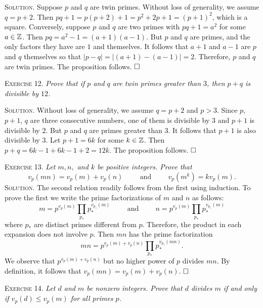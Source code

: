 \documentclass[11pt, leqno]{article}
\newcommand{\done}{\ensuremath{\hfill\square}}
\begin{document}
\textsc{Solution}. Suppose $p$ and $q$ are twin primes. Without loss of generality, we assume $q = p+2$. Then $pq+1 = p(p+2) + 1 = p^2 + 2p + 1 = (p+1)^2$, which is a square. Conversely, suppose $p$ and $q$ are two primes with $pq+1 = a^2$ for some $a\in\mathbb{Z}$. Then $pq = a^2-1 = (a+1)(a-1)$. But $p$ and $q$ are primes, and the only factors they have are $1$ and themselves. It follows that $a+1$ and $a-1$ are $p$ and $q$ themselves so that $|p-q| = |(a+1)-(a-1)| =  2$. Therefore, $p$ and $q$ are twin primes. The proposition follows. \done

\textsc{Exercise 12}. \emph{Prove that if $p$ and $q$ are twin primes greater than $3$, then $p+q$ is divisible by $12$.}

\textsc{Solution}. Without loss of generality, we assume $q = p+2$ and $p>3$. Since $p$, $p+1$, $q$ are three consecutive numbers, one of them is divisible by $3$ and $p+1$ is divisible by $2$. But $p$ and $q$ are primes greater than $3$. It follows that $p+1$ is also divisible by $3$. Let $p+1 = 6k$ for some $k\in\mathbb{Z}$. Then $p+q = 6k - 1 + 6k-1 + 2 = 12k$. The proposition follows. \done

\textsc{Exercise 13}. \emph{Let $m, n,$ and $k$ be positive integers. Prove that 
\begin{displaymath}
v_p(mn) = v_p(m) + v_p(n) \hspace{1cm}\text{and}\hspace{1cm} v_p(m^k) = kv_p(m).
\end{displaymath}}\textsc{Solution}. The second relation readily follows from the first using induction. To prove the first we write the prime factorizations of $m$ and $n$ as follows: 
\begin{displaymath}
m = p^{v_p(m)}\prod_{p_{*}}^{} p_{*}^{v_{p_{*}}(m)} \hspace{1cm}\text{and}\hspace{1cm} n = p^{v_p(m)}\prod_{p_{*}}^{} p_{*}^{v_{p_{*}}(m)}
\end{displaymath}
where $p_{*}$ are distinct primes different from $p$. Therefore, the product in each expansion does not involve $p$. Then $mn$ has the prime factorization 
\begin{displaymath}
mn = p^{v_p(m)+v_p(n)}\prod_{p_{*}}^{}p_{*}^{v_{p_{*}}(mn)}.
\end{displaymath}
We observe that $p^{v_p(m)+v_p(n)}$ but no higher power of $p$ divides $mn$. By definition, it follows that $v_p(mn) = v_p(m) + v_p(n)$. \done

\textsc{Exercise 14}. \emph{Let $d$ and $m$ be nonzero integers. Prove that $d$ divides $m$ if and only if $v_p(d)\leq v_p(m)$ for all primes $p$.}
\end{document}

